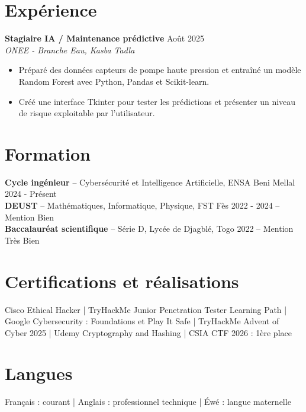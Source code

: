 \documentclass[10pt,a4paper]{article}
\newcommand{\role}[3]{%
  \textbf{#1} \hfill #3\\
  \textit{#2}\vspace{1pt}
}
\newcommand{\edu}[4]{%
  \textbf{#1} -- #2 \hfill #3 #4\\[-1pt]
}
\begin{document}
\section{Expérience}
\role{Stagiaire IA / Maintenance prédictive}{ONEE - Branche Eau, Kasba Tadla}{Août 2025}
\begin{itemize}
  \item Préparé des données capteurs de pompe haute pression et entraîné un modèle Random Forest avec Python, Pandas et Scikit-learn.
  \item Créé une interface Tkinter pour tester les prédictions et présenter un niveau de risque exploitable par l'utilisateur.
\end{itemize}

\section{Formation}
\edu{Cycle ingénieur}{Cybersécurité et Intelligence Artificielle, ENSA Beni Mellal}{2024 - Présent}{}
\edu{DEUST}{Mathématiques, Informatique, Physique, FST Fès}{2022 - 2024}{-- Mention Bien}
\edu{Baccalauréat scientifique}{Série D, Lycée de Djagblé, Togo}{2022}{-- Mention Très Bien}

\section{Certifications et réalisations}
Cisco Ethical Hacker | TryHackMe Junior Penetration Tester Learning Path | Google Cybersecurity : Foundations et Play It Safe | TryHackMe Advent of Cyber 2025 | Udemy Cryptography and Hashing | CSIA CTF 2026 : 1ère place

\section{Langues}
Français : courant | Anglais : professionnel technique | Éwé : langue maternelle
\end{document}
